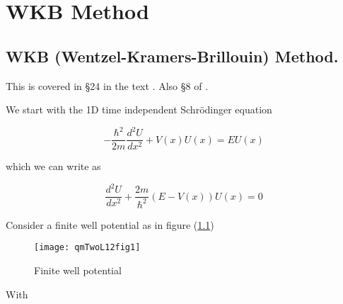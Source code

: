 %
%

\chapter{WKB Method}
\label{chap:qmTwoL12}
{}
\date{Oct 19, 2011}

\beginArtWithToc

%

\section{WKB (Wentzel-Kramers-Brillouin) Method.}

This is covered in \S 24 in the text \cite{desai2009quantum}.  Also \S 8 of \cite{griffiths2005introduction}.

We start with the 1D time independent Schr\"{o}dinger equation

\begin{equation}\label{eqn:qmTwoL12:10}
-\frac{\hbar^2}{2m} \frac{d^2 U}{dx^2} + V(x) U(x) = E U(x)
\end{equation}

which we can write as

\begin{equation}\label{eqn:qmTwoL12:30}
\frac{d^2 U}{dx^2} + \frac{2m}{\hbar^2} (E - V(x)) U(x) = 0
\end{equation}

Consider a finite well potential as in figure (\ref{fig:qmTwoL13:qmTwoL12fig1})

\begin{figure}[htp]
   \centering
   \texttt{[image: qmTwoL12fig1]}
   \caption{Finite well potential}\label{fig:qmTwoL13:qmTwoL12fig1}
\end{figure}

With


